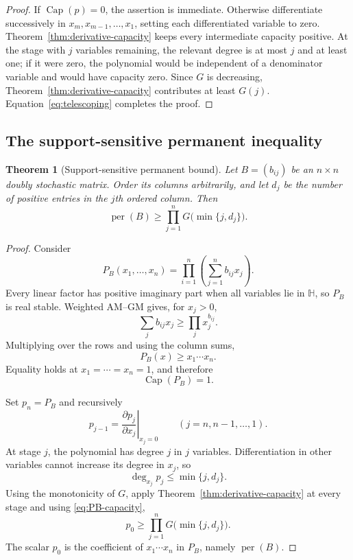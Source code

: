 \documentclass[11pt]{article}
\newtheorem{theorem}{Theorem}[section]
\theoremstyle{definition}
\newcommand{\per}{\operatorname{per}}
\newcommand{\pcap}{\operatorname{Cap}}
\newcommand{\1}{\mathbf{1}}
\newcommand{\cH}{\mathbb{H}}
\begin{document}
\begin{proof}
If $\pcap(p)=0$, the assertion is immediate.  Otherwise differentiate successively in $x_m,x_{m-1},\dots,x_1$, setting each differentiated variable to zero.  Theorem~\ref{thm:derivative-capacity} keeps every intermediate capacity positive.  At the stage with $j$ variables remaining, the relevant degree is at most $j$ and at least one; if it were zero, the polynomial would be independent of a denominator variable and would have capacity zero.  Since $G$ is decreasing, Theorem~\ref{thm:derivative-capacity} contributes at least $G(j)$.  Equation~\eqref{eq:telescoping} completes the proof.
\end{proof}

\subsection{The support-sensitive permanent inequality}

\begin{theorem}[Support-sensitive permanent bound]\label{thm:support-bound}
Let $B=(b_{ij})$ be an $n\times n$ doubly stochastic matrix.  Order its columns arbitrarily, and let $d_j$ be the number of positive entries in the $j$th ordered column.  Then
\[
 \per(B)\ge
 \prod_{j=1}^nG\bigl(\min\{j,d_j\}\bigr).
 \tag{3.4}\label{eq:support-bound}
\]
\end{theorem}

\begin{proof}
Consider
\[
 P_B(x_1,\dots,x_n)
 =\prod_{i=1}^n\left(\sum_{j=1}^n b_{ij}x_j\right).
\]
Every linear factor has positive imaginary part when all variables lie in $\cH$, so $P_B$ is real stable.  Weighted AM--GM gives, for $x_j>0$,
\[
 \sum_jb_{ij}x_j\ge\prod_jx_j^{b_{ij}}.
\]
Multiplying over the rows and using the column sums,
\[
 P_B(x)\ge x_1\cdots x_n.
\]
Equality holds at $x_1=\cdots=x_n=1$, and therefore
\[
 \pcap(P_B)=1.
 \tag{3.5}\label{eq:PB-capacity}
\]

Set $p_n=P_B$ and recursively
\[
 p_{j-1}
 =\left.\frac{\partial p_j}{\partial x_j}\right|_{x_j=0}
 \qquad(j=n,n-1,\dots,1).
\]
At stage $j$, the polynomial has degree $j$ in $j$ variables.  Differentiation in other variables cannot increase its degree in $x_j$, so
\[
 \deg_{x_j}p_j\le\min\{j,d_j\}.
\]
Using the monotonicity of $G$, apply Theorem~\ref{thm:derivative-capacity} at every stage and using \eqref{eq:PB-capacity},
\[
 p_0\ge\prod_{j=1}^nG\bigl(\min\{j,d_j\}\bigr).
\]
The scalar $p_0$ is the coefficient of $x_1\cdots x_n$ in $P_B$, namely $\per(B)$.
\end{proof}
\end{document}

